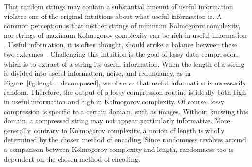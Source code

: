 That random strings may contain a substantial amount of useful information violates one of the original intuitions about what useful information is.
A common perception is that neither strings of minimum Kolmogorov complexity, nor strings of maximum Kolmogorov complexity can be rich in useful information \parencite{adriaans2012facticity}.
Useful information, it is often thought, should strike a balance between these two extremes~\parencite{vitanyi2006meaningful,adriaans2012facticity}.
Challenging this intuition is the goal of lossy data compression, which is to extract of a string its useful information.
When the length of a string is divided into useful information, noise, and redundancy, as in Figure~\ref{fig:length_decomposed}, we observe that useful information is necessarily random.
Therefore, the output of a lossy compression routine is ideally both high in useful information and high in Kolmogorov complexity.
Of course, lossy compression is specific to a certain domain, such as images.
Without knowing this domain, a compressed string may not appear particularly informative.
More generally, contrary to Kolmogorov complexity, a notion of length is wholly determined by the chosen method of encoding.
Since randomness revolves around a comparison between Kolmogorov complexity and length, randomness too is dependent on the chosen method of encoding.

